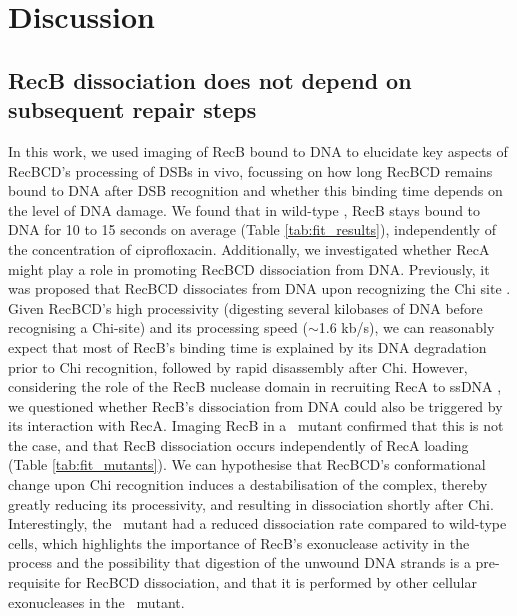 \section*{Discussion}

\subsection*{RecB dissociation does not depend on subsequent repair steps}
In this work, we used imaging of RecB bound to DNA to elucidate key aspects of RecBCD's processing of DSBs in vivo, focussing on how long RecBCD remains bound to DNA after DSB recognition and whether this binding time depends on the level of DNA damage. We found that in wild-type \ecoli, RecB stays bound to DNA for 10 to 15 seconds on average (Table \ref{tab:fit_results}), independently of the concentration of ciprofloxacin. Additionally, we investigated whether RecA might play a role in promoting RecBCD dissociation from DNA. Previously, it was proposed that RecBCD dissociates from DNA upon recognizing the Chi site \cite{Taylor1999}. Given RecBCD's high processivity (digesting several kilobases of DNA before recognising a Chi-site) and its processing speed ($\sim$1.6 kb/s\cite{Wiktor2018}), we can reasonably expect that most of RecB's binding time is explained by its DNA degradation prior to Chi recognition, followed by rapid disassembly after Chi. However, considering the role of the RecB nuclease domain in recruiting RecA to ssDNA \cite{Spies2006}, we questioned whether RecB's dissociation from DNA could also be triggered by its interaction with RecA. Imaging RecB in a \dreca\ mutant confirmed that this is not the case, and that RecB dissociation occurs independently of RecA loading (Table \ref{tab:fit_mutants}). We can hypothesise that RecBCD's conformational change upon Chi recognition induces a destabilisation of the complex, thereby greatly reducing its processivity, and resulting in dissociation shortly after Chi. Interestingly, the \geneteneighty\ mutant had a reduced dissociation rate compared to wild-type cells, which highlights the importance of RecB's exonuclease activity in the process and the possibility that digestion of the unwound DNA strands is a pre-requisite for RecBCD dissociation, and that it is performed by other cellular exonucleases in the \geneteneighty\ mutant.

